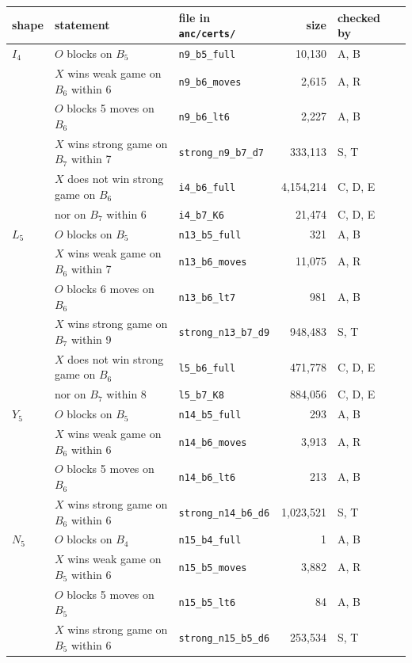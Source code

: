 \documentclass[11pt]{article}
\theoremstyle{definition}
\theoremstyle{remark}
\newcommand{\file}[1]{\texttt{#1}}
\begin{document}
\begin{table}[ht]
\centering\small
\begin{tabular}{@{}lllrll@{}}
\toprule
shape & statement & file in \file{anc/certs/} & size & checked by\\
\midrule
$I_4$ & $O$ blocks on $B_5$ & \file{n9\_b5\_full} & 10{,}130 & A, B\\
      & $X$ wins weak game on $B_6$ within 6 & \file{n9\_b6\_moves} & 2{,}615 & A, R\\
      & $O$ blocks 5 moves on $B_6$ & \file{n9\_b6\_lt6} & 2{,}227 & A, B\\
      & $X$ wins strong game on $B_7$ within 7 & \file{strong\_n9\_b7\_d7} & 333{,}113 & S, T\\
      & $X$ does not win strong game on $B_6$ & \file{i4\_b6\_full} & 4{,}154{,}214 & C, D, E\\
      & \quad nor on $B_7$ within 6 & \file{i4\_b7\_K6} & 21{,}474 & C, D, E\\
$L_5$ & $O$ blocks on $B_5$ & \file{n13\_b5\_full} & 321 & A, B\\
      & $X$ wins weak game on $B_6$ within 7 & \file{n13\_b6\_moves} & 11{,}075 & A, R\\
      & $O$ blocks 6 moves on $B_6$ & \file{n13\_b6\_lt7} & 981 & A, B\\
      & $X$ wins strong game on $B_7$ within 9 & \file{strong\_n13\_b7\_d9} & 948{,}483 & S, T\\
      & $X$ does not win strong game on $B_6$ & \file{l5\_b6\_full} & 471{,}778 & C, D, E\\
      & \quad nor on $B_7$ within 8 & \file{l5\_b7\_K8} & 884{,}056 & C, D, E\\
$Y_5$ & $O$ blocks on $B_5$ & \file{n14\_b5\_full} & 293 & A, B\\
      & $X$ wins weak game on $B_6$ within 6 & \file{n14\_b6\_moves} & 3{,}913 & A, R\\
      & $O$ blocks 5 moves on $B_6$ & \file{n14\_b6\_lt6} & 213 & A, B\\
      & $X$ wins strong game on $B_6$ within 6 & \file{strong\_n14\_b6\_d6} & 1{,}023{,}521 & S, T\\
$N_5$ & $O$ blocks on $B_4$ & \file{n15\_b4\_full} & 1 & A, B\\
      & $X$ wins weak game on $B_5$ within 6 & \file{n15\_b5\_moves} & 3{,}882 & A, R\\
      & $O$ blocks 5 moves on $B_5$ & \file{n15\_b5\_lt6} & 84 & A, B\\
      & $X$ wins strong game on $B_5$ within 6 & \file{strong\_n15\_b5\_d6} & 253{,}534 & S, T\\

\end{tabular}
\end{table}
\end{document}
